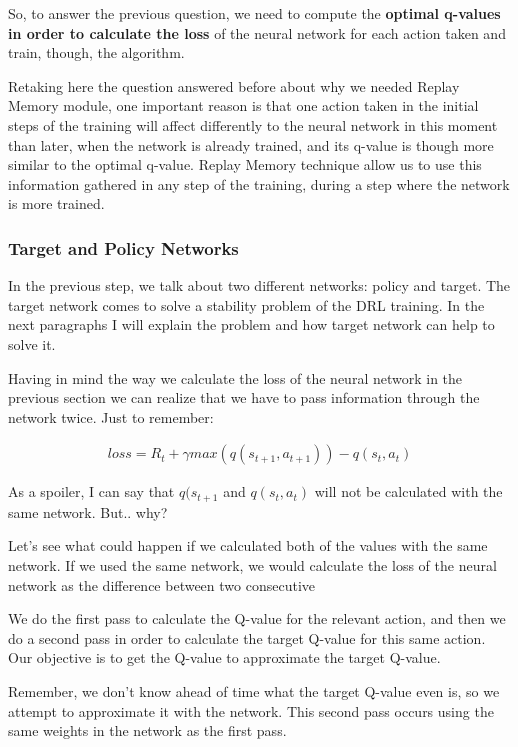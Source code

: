 			So, to answer the previous question, we need to compute the\textbf{ optimal q-values in order to calculate the loss} of the neural network for each action taken and train, though, the algorithm.
			
			Retaking here the question answered before about why we needed Replay Memory module, one important reason is that one action taken in the initial steps of the training will affect differently to the neural network in this moment than later, when the network is already trained, and its q-value is though more similar to the optimal q-value. Replay Memory technique allow us to use this information gathered in any step of the training, during a step where the network is more trained.
			
		
		\subsubsection{Target and Policy Networks}
			In the previous step, we talk about two different networks: policy and target. The target network comes to solve a stability problem of the DRL training. In the next paragraphs I will explain the problem and how target network can help to solve it.
			
			Having in mind the way we calculate the loss of the neural network in the previous section we can realize that we have to pass information through the network twice. Just to remember:
			
			\begin{gather*}
				loss = R_t + \gamma max(q(s_{t+1}, a_{t+1})) - q(s_t, a_t)
			\end{gather*}
		
			As a spoiler, I can say that $q(s_{t+1}$ and $q(s_t, a_t)$ will not be calculated with the same network. But.. why?
			
			Let's see what could happen if we calculated both of the values with the same network. If we used the same network, we would calculate the loss of the neural network as the difference between two consecutive 
			
			
			
			
			
			
			
			We do the first pass to calculate the Q-value for the relevant action, and then we do a second pass in order to calculate the target Q-value for this same action. Our objective is to get the Q-value to approximate the target Q-value.
			
			Remember, we don't know ahead of time what the target Q-value even is, so we attempt to approximate it with the network. This second pass occurs using the same weights in the network as the first pass.
			
